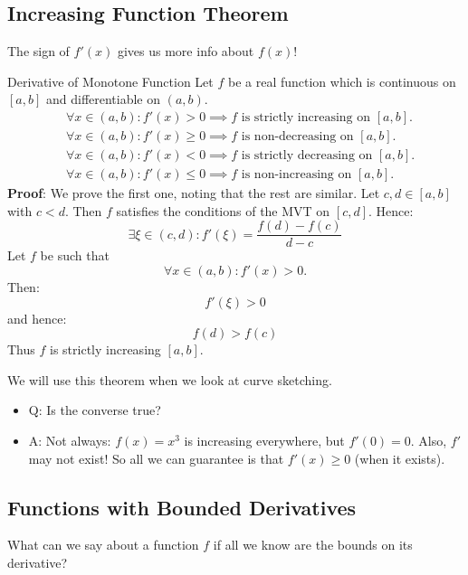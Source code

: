 \subsection{Increasing Function Theorem}
The sign of $ f'(x) $ gives us more info about $ f(x) $!
\begin{Theorem}{Derivative of Monotone Function}{}
    Let $ f $ be a real function which is continuous on $ [a,b] $ and differentiable on $ (a,b) $.
    \begin{align*}
         & \forall x\in(a,b):f'(x)> 0\implies f\text{ is strictly increasing on }[a,b]. \\
         & \forall x\in(a,b):f'(x)\ge 0\implies f\text{ is non-decreasing on }[a,b].    \\
         & \forall x\in(a,b):f'(x)< 0\implies f\text{ is strictly decreasing on }[a,b]. \\
         & \forall x\in(a,b):f'(x)\le 0\implies f\text{ is non-increasing on }[a,b].
    \end{align*}
    \tcblower{}
    \textbf{Proof}: We prove the first one, noting that the rest are similar.
    Let $ c,d\in[a,b] $ with $ c<d $. Then $ f $ satisfies the conditions of the MVT on $ [c,d] $. Hence:
    \[ \exists \xi\in(c,d):f'(\xi)=\frac{f(d)-f(c)}{d-c} \]
    Let $ f $ be such that
    \[ \forall x\in(a,b):f'(x)> 0.\]
    Then:
    \[ f'(\xi)>0 \]
    and hence:
    \[ f(d)>f(c) \]
    Thus $ f $ is strictly increasing $ [a,b] $.
\end{Theorem}
We will use this theorem when we look at curve sketching.
\begin{itemize}
    \item Q\@: Is the converse true?
    \item A\@: Not always: $ f(x)=x^3 $ is increasing everywhere, but $ f'(0)=0 $. Also, $ f' $ may not exist!
          So all we can guarantee is that $ f'(x)\ge 0 $ (when it exists).
\end{itemize}
\subsection{Functions with Bounded Derivatives}
What can we say about a function $ f $ if all we know are the bounds on its derivative?

